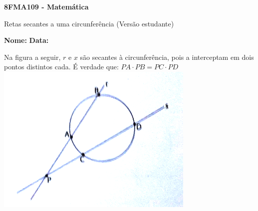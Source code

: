 \documentclass[a4paper,14pt]{article}
\begin{document}
	
	\noindent\textbf{8FMA109 - Matemática} 
	
	\begin{center}Retas secantes a uma circunferência (Versão estudante)
	\end{center}
	
	\noindent\textbf{Nome:} \underline{\hspace{10cm}}
	\noindent\textbf{Data:} \underline{\hspace{4cm}}
	
    \begin{multicols}{2}
    	\noindent Na figura a seguir, $r$ e $x$ são secantes à circunferência, pois a interceptam em dois pontos distintos cada. É verdade que:
    	$PA \cdot PB = PC \cdot PD$ \includegraphics[width=1\linewidth]{imagens_8FMA109/imagem1}
    	

\end{multicols}
\end{document}
